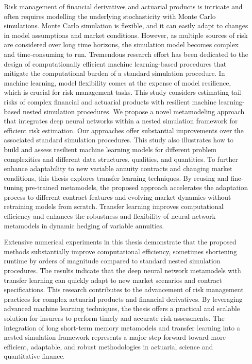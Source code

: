 Risk management of financial derivatives and actuarial products is intricate and often requires modelling the underlying stochasticity with Monte Carlo simulations.
Monte Carlo simulation is flexible, and it can easily adapt to changes in model assumptions and market conditions.
However, as multiple sources of risk are considered over long time horizons, the simulation model becomes complex and time-consuming to run. 
Tremendous research effort has been dedicated to the design of computationally efficient machine learning-based procedures that mitigate the computational burden of a standard simulation procedure.
In machine learning, model flexibility comes at the expense of model resilience, which is crucial for risk management tasks.
This study considers estimating tail risks of complex financial and actuarial products with resilient machine learning-based nested simulation procedures.
We propose a novel metamodeling approach that integrates deep neural networks within a nested simulation framework for efficient risk estimation.
Our approaches offer substantial improvements over the associated standard simulation procedures.
This study also illustrates how to build and assess resilient machine learning models for different problem complexities and different data structures, qualities, and quantities.
To further enhance adaptability to new variable annuity contracts and changing market conditions, this thesis explores transfer learning techniques. 
By reusing and fine-tuning pre-trained metamodels, the proposed approach accelerates the adaptation process to different contract features and evolving market dynamics without retraining models from scratch. 
Transfer learning improves computational efficiency and enhances the robustness and flexibility of neural network metamodels in dynamic hedging of variable annuities.

Extensive numerical experiments in this thesis demonstrate that the proposed methods substantially improve computational efficiency, sometimes shortening runtime by orders of magnitude compared to standard nested simulation procedures. 
The results indicate that the deep neural network metamodels with transfer learning can quickly adapt to new market scenarios and contract specifications.
This research contributes to the advancement of risk management practices for complex actuarial products and financial derivatives.
By leveraging advanced machine learning techniques, the thesis offers a practical and scalable solution for insurers to perform timely and accurate risk assessments.
The integration of long short-term memory metamodels and transfer learning into a nested simulation framework represents a major step forward toward more efficient, adaptable, and robust methodologies in actuarial science and quantitative finance.


